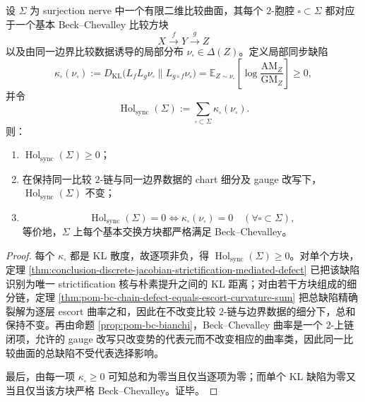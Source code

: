 \begin{theorem}\label{thm:conclusion-sync-holonomy-bc-certificate}
设 \(\Sigma\) 为 surjection nerve 中一个有限二维比较曲面，其每个 \(2\)-胞腔 \(\square\subset\Sigma\) 都对应于一个基本 Beck--Chevalley 比较方块
\[
X\xrightarrow{f}Y\xrightarrow{g}Z
\]
以及由同一边界比较数据诱导的局部分布 \(\nu_\square\in\Delta(Z)\)。定义局部同步缺陷
\[
\kappa_\square(\nu_\square)
:=
D_{\mathrm{KL}}\!\bigl(L_fL_g\nu_\square\|L_{g\circ f}\nu_\square\bigr)
=
\mathbb E_{Z\sim \nu_\square}\!\left[\log\frac{\mathrm{AM}_Z}{\mathrm{GM}_Z}\right]\ge 0,
\]
并令
\[
\operatorname{Hol}_{\mathrm{sync}}(\Sigma)
:=
\sum_{\square\subset\Sigma}\kappa_\square(\nu_\square).
\]
则：
\begin{enumerate}
  \item \(\operatorname{Hol}_{\mathrm{sync}}(\Sigma)\ge 0\)；
  \item 在保持同一比较 \(2\)-链与同一边界数据的 chart 细分及 gauge 改写下，\(\operatorname{Hol}_{\mathrm{sync}}(\Sigma)\) 不变；
  \item
  \[
  \operatorname{Hol}_{\mathrm{sync}}(\Sigma)=0
  \iff
  \kappa_\square(\nu_\square)=0\quad(\forall \square\subset\Sigma),
  \]
  等价地，\(\Sigma\) 上每个基本交换方块都严格满足 Beck--Chevalley。
\end{enumerate}
\end{theorem}
\begin{proof}
每个 \(\kappa_\square\) 都是 KL 散度，故逐项非负，得 \(\operatorname{Hol}_{\mathrm{sync}}(\Sigma)\ge0\)。对单个方块，定理 \ref{thm:conclusion-discrete-jacobian-strictification-mediated-defect} 已把该缺陷识别为唯一 strictification 核与朴素提升之间的 KL 距离；对由若干方块组成的细分链，定理 \ref{thm:pom-bc-chain-defect-equals-escort-curvature-sum} 把总缺陷精确裂解为逐层 escort 曲率之和，因此在不改变比较 \(2\)-链与边界数据的细分下，总和保持不变。再由命题 \ref{prop:pom-bc-bianchi}，Beck--Chevalley 曲率是一个 \(2\)-上链闭项，允许的 gauge 改写只改变势的代表元而不改变相应的曲率类，因此同一比较曲面的总缺陷不受代表选择影响。

最后，由每一项 \(\kappa_\square\ge0\) 可知总和为零当且仅当逐项为零；而单个 KL 缺陷为零又当且仅当该方块严格 Beck--Chevalley。证毕。
\end{proof}

